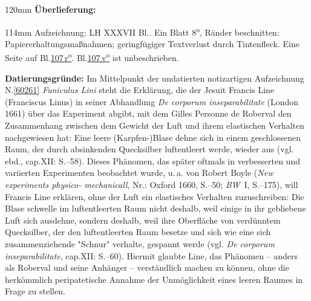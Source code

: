 %
\frenchspacing%
\begin{ledgroupsized}[r]{120mm}%
\footnotesize%
\pstart%
\noindent%
\textbf{Überlieferung:}%
\pend%
\end{ledgroupsized}%
\begin{ledgroupsized}[r]{114mm}%
\footnotesize%
\pstart%
\parindent -6mm%
%
Aufzeichnung:
LH XXXVII Bl..
Ein Blatt 8\textsuperscript{o},
Ränder beschnitten:
Papiererhaltungsmaßnahmen;
geringfügiger Textverlust durch Tintenfleck.
Eine Seite auf Bl.\;\href{\Scan{LH_37_04_107r}}{107\,r\textsuperscript{o}}.
Bl.\;\href{\Scan{LH_37_04_107v}}{107\,v\textsuperscript{o}} ist unbeschrieben.
\pend%
\end{ledgroupsized}%
\vspace{5mm}%
\begin{ledgroup}%
\footnotesize%
\pstart%
\noindent%
\textbf{Datierungsgründe:}
Im Mittelpunkt der undatierten notizartigen Aufzeichnung N.\;\ref{60261} \textit{Funiculus Lini} steht die Erklärung, die der Jesuit Francis Line (Franciscus Linus) in seiner Abhandlung \textit{De corporum inseparabilitate} (London 1661)\cite{00072} über das Experiment abgibt, mit dem Gilles Personne de Roberval den Zusammenhang zwischen dem Gewicht der Luft und ihrem elastischen Verhalten nachgewiesen hat:
Eine leere (Karpfen-)Blase dehne sich in einem geschlossenen Raum, der durch absinkenden Quecksilber luftentleert werde, wieder aus (vgl. %
ebd., cap.\;XII: S.--58).\cite{00072}
Dieses Phänomen, das später oftmals in verbesserten und variierten Experimenten beobachtet wurde, u.\,a. von Robert Boyle (\textit{New experiments physico- mechanicall}, Nr.: Oxford 1660, S.--50; \textit{BW}~I, S.--175),\cite{00015}\cite{00017}
will Francis Line erklären, ohne der Luft ein elastisches Verhalten zuzuschreiben:
Die Blase schwelle im luftentleerten Raum nicht deshalb, weil einige in ihr gebliebene Luft sich ausdehne, sondern deshalb, weil ihre Oberfläche von verdünntem Quecksilber, der den luftentleerten Raum besetze und sich wie eine sich zusammenziehende "Schnur" verhalte, gespannt werde (vgl. \textit{De corporum inseparabilitate}, cap.\;XII: S.--60).\cite{00072}
Hiermit glaubte Line, das Phänomen -- anders als Roberval und seine Anhänger -- verständlich machen zu können, ohne die herkömmlich peripatetische Annahme der Unmöglichkeit eines leeren Raumes in Frage zu stellen.

\end{ledgroup}
